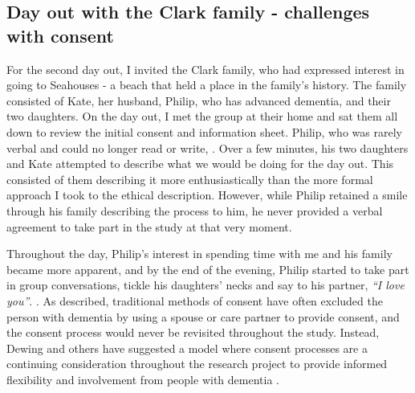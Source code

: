 \subsection{Day out with the Clark family - challenges with consent}
\label{ClarkFamily}
For the second day out, I invited the Clark family, who had expressed interest in going to Seahouses - a beach that held a place in the family's history. The family consisted of Kate, her husband, Philip, who has advanced dementia, and their two daughters. On the day out, I met the group at their home and sat them all down to review the initial consent and information sheet. Philip, who was rarely verbal and could no longer read or write, . Over a few minutes, his two daughters and Kate attempted to describe what we would be doing for the day out. This consisted of them describing it more enthusiastically than the more formal approach I took to the ethical description. However, while Philip retained a smile through his family describing the process to him, he never provided a verbal agreement to take part in the study at that very moment.

 Throughout the day, Philip's interest in spending time with me and his family became more apparent, and by the end of the evening, Philip started to take part in group conversations, tickle his daughters' necks and say to his partner, \textit{``I love you''}. . As \cite{dewing_participatory_2007} described, traditional methods of consent have often excluded the person with dementia by using a spouse or care partner to provide consent, and the consent process would never be revisited throughout the study. Instead, Dewing and others have suggested a model where consent processes are a continuing consideration throughout the research project to provide informed flexibility and involvement from people with dementia \citep{dewing_participatory_2007,slaughter2007consent,mckeown_actively_2009}.

